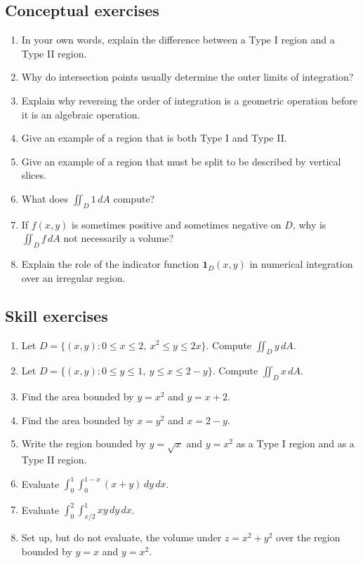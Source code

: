 \documentclass[11pt]{article}
\newcommand{\one}{\mathbf 1}
\begin{document}
\subsection*{Conceptual exercises}
\begin{enumerate}
  \item In your own words, explain the difference between a Type I region and a Type II region.
  \item Why do intersection points usually determine the outer limits of integration?
  \item Explain why reversing the order of integration is a geometric operation before it is an algebraic operation.
  \item Give an example of a region that is both Type I and Type II.
  \item Give an example of a region that must be split to be described by vertical slices.
  \item What does $\iint_D1\,dA$ compute?
  \item If $f(x,y)$ is sometimes positive and sometimes negative on $D$, why is $\iint_D f\,dA$ not necessarily a volume?
  \item Explain the role of the indicator function $\one_D(x,y)$ in numerical integration over an irregular region.
\end{enumerate}

\subsection*{Skill exercises}
\begin{enumerate}[start=9]
  \item Let $D=\{(x,y):0\le x\le2,\ x^2\le y\le2x\}$. Compute $\iint_D y\,dA$.
  \item Let $D=\{(x,y):0\le y\le1,\ y\le x\le2-y\}$. Compute $\iint_D x\,dA$.
  \item Find the area bounded by $y=x^2$ and $y=x+2$.
  \item Find the area bounded by $x=y^2$ and $x=2-y$.
  \item Write the region bounded by $y=\sqrt{x}$ and $y=x^2$ as a Type I region and as a Type II region.
  \item Evaluate $\int_0^1\int_0^{1-x}(x+y)\,dy\,dx$.
  \item Evaluate $\int_0^2\int_{x/2}^{1}xy\,dy\,dx$.
  \item Set up, but do not evaluate, the volume under $z=x^2+y^2$ over the region bounded by $y=x$ and $y=x^2$.
\end{enumerate}
\end{document}
